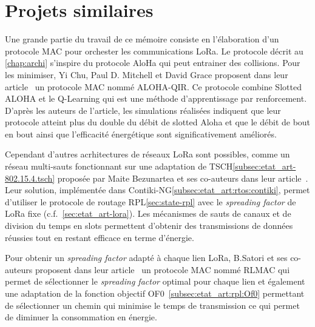 \section{Projets similaires}\label{sec:etat_art-related-work}
\renewcommand{\rightmark}{Projet similaires}

Une grande partie du travail de ce mémoire consiste en l'élaboration d'un protocole MAC pour
orchester les communications LoRa. Le protocole décrit au \autoref{chap:archi} s'inspire du
protocole AloHa qui peut entrainer des collisions. Pour les minimiser, Yi Chu, Paul D. Mitchell et
David Grace proposent dans leur article~\cite{6328420} un protocole MAC nommé ALOHA-QIR. Ce
protocole combine Slotted ALOHA et le Q-Learning qui est une méthode d'apprentissage par
renforcement. D'après les auteurs de l'article, les simulations réalisées indiquent que leur
protocole atteint plus du double du débit de slotted Aloha et que le débit de bout en bout ainsi
que l'efficacité énergétique sont significativement améliorés.


Cependant d'autres acrhitectures de réseaux LoRa sont possibles, comme un réseau multi-sauts
fonctionnant sur une adaptation de TSCH\ref{subsec:etat_art-802.15.4.tsch} proposée par Maite Bezunartea et ses co-auteurs dans leur article~\cite{8847137}. Leur solution, implémentée dans Contiki-NG\ref{subsec:etat_art:rtos:contiki}, permet d'utiliser le protocole de routage RPL\ref{sec:state-rpl} avec le \textit{spreading factor} de LoRa fixe (c.f.~\ref{sec:etat_art-lora}). Les mécanismes de sauts de canaux et de division du temps en slots permettent d'obtenir des transmissions de données réussies tout en restant efficace en terme d'énergie.

Pour obtenir un \textit{spreading factor} adapté à chaque lien LoRa, B.Satori et ses co-auteurs proposent dans leur article~\cite{8115756} un protocole MAC nommé RLMAC qui permet de sélectionner le \textit{spreading factor} optimal pour chaque lien et également une adaptation de la fonction objectif OF0~\ref{subsec:etat_art:rpl:Of0} permettant de sélectionner un chemin qui minimise le temps de transmission ce qui permet de diminuer la consommation en énergie.


% 
